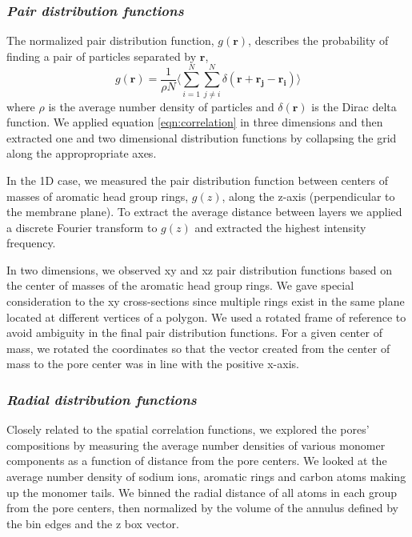 \documentclass[journal=jpcbfk,manusciprt=article]{achemso}
\begin{document}
  \subsubsection{\textit{Pair distribution functions}}

  The normalized pair distribution function, $g(\mathbf{r})$, describes
  the probability of finding a pair of particles separated by $\mathbf{r}$,
  \begin{equation}
	g(\mathbf{r})= \frac{1}{\rho N} \Bigg \langle \sum_{i=1}^{N}\sum_{j\neq i}^{N} \delta(\mathbf{r}+\mathbf{r_j}-\mathbf{r_i}) \Bigg \rangle
	\label{eqn:correlation}
  \end{equation}
  where $\rho$ is the average number density of particles and
  $\delta(\mathbf{r})$ is the Dirac delta function\cite{kuriabova_linear_2010}.
  We applied equation \ref{eqn:correlation} in three dimensions and then
  extracted one and two dimensional distribution functions by collapsing the grid
  along the appropropriate axes.

  In the 1D case, we measured the pair distribution function between centers of
  masses of aromatic head group rings, $g(z)$, along the z-axis (perpendicular to
  the membrane plane). To extract the average distance between layers we applied
  a discrete Fourier transform to $g(z)$ and extracted the highest intensity
  frequency.

  In two dimensions, we observed xy and xz pair distribution functions based on
  the center of masses of the aromatic head group rings. We gave special
  consideration to the xy cross-sections since multiple rings exist in the same
  plane located at different vertices of a polygon. We used a rotated frame of
  reference to avoid ambiguity in the final pair distribution functions. For a
  given center of mass, we rotated the coordinates so that the vector created
  from the center of mass to the pore center was in line with the positive
  x-axis. 

  \subsubsection{\textit{Radial distribution functions}}
  Closely related to the spatial correlation functions, we explored the pores'
  compositions by measuring the average number densities of various monomer
  components as a function of distance from the pore centers. We looked at the
  average number density of sodium ions, aromatic rings and carbon atoms making
  up the monomer tails. We binned the radial distance of all atoms in each group
  from the pore centers, then normalized by the volume of the annulus defined by
  the bin edges and the z box vector.
\end{document}
